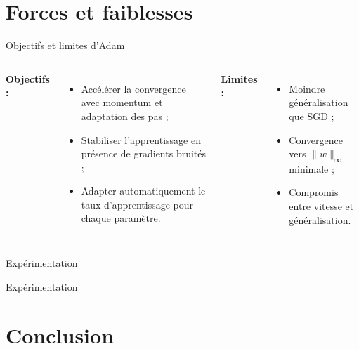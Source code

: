 \documentclass{beamer}
\begin{document}

\section{Forces et faiblesses}

\begin{frame}{Objectifs et limites d’Adam}

\begin{columns}[T]
\textbf{Objectifs :}
\begin{itemize}
  \item Accélérer la convergence avec momentum et adaptation des pas ;
  \item Stabiliser l’apprentissage en présence de gradients bruités ;
  \item Adapter automatiquement le taux d’apprentissage pour chaque paramètre.
\end{itemize}

\textbf{Limites :}
\begin{itemize}
  \item Moindre généralisation que SGD \cite{wilson2017} ;
  \item Convergence vers $\|w\|_\infty$ minimale ;
  \item Compromis entre vitesse et généralisation.
\end{itemize}
\end{columns}

\end{frame}


\begin{frame}{Expérimentation}
\end{frame}

\begin{frame}{Expérimentation}
\end{frame}

\section{Conclusion}
\end{document}
